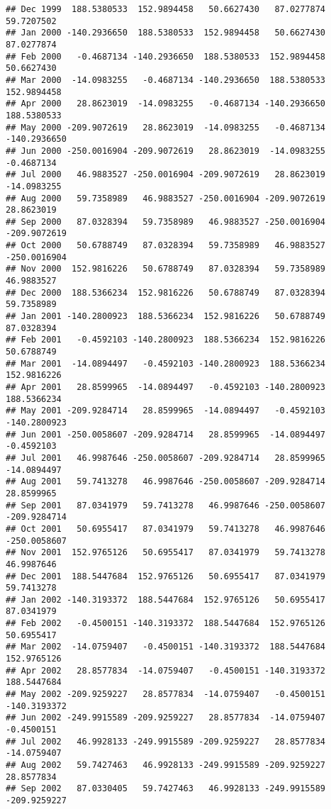 \documentclass[]{article}
\begin{document}
\begin{verbatim}
## Dec 1999  188.5380533  152.9894458   50.6627430   87.0277874   59.7207502
## Jan 2000 -140.2936650  188.5380533  152.9894458   50.6627430   87.0277874
## Feb 2000   -0.4687134 -140.2936650  188.5380533  152.9894458   50.6627430
## Mar 2000  -14.0983255   -0.4687134 -140.2936650  188.5380533  152.9894458
## Apr 2000   28.8623019  -14.0983255   -0.4687134 -140.2936650  188.5380533
## May 2000 -209.9072619   28.8623019  -14.0983255   -0.4687134 -140.2936650
## Jun 2000 -250.0016904 -209.9072619   28.8623019  -14.0983255   -0.4687134
## Jul 2000   46.9883527 -250.0016904 -209.9072619   28.8623019  -14.0983255
## Aug 2000   59.7358989   46.9883527 -250.0016904 -209.9072619   28.8623019
## Sep 2000   87.0328394   59.7358989   46.9883527 -250.0016904 -209.9072619
## Oct 2000   50.6788749   87.0328394   59.7358989   46.9883527 -250.0016904
## Nov 2000  152.9816226   50.6788749   87.0328394   59.7358989   46.9883527
## Dec 2000  188.5366234  152.9816226   50.6788749   87.0328394   59.7358989
## Jan 2001 -140.2800923  188.5366234  152.9816226   50.6788749   87.0328394
## Feb 2001   -0.4592103 -140.2800923  188.5366234  152.9816226   50.6788749
## Mar 2001  -14.0894497   -0.4592103 -140.2800923  188.5366234  152.9816226
## Apr 2001   28.8599965  -14.0894497   -0.4592103 -140.2800923  188.5366234
## May 2001 -209.9284714   28.8599965  -14.0894497   -0.4592103 -140.2800923
## Jun 2001 -250.0058607 -209.9284714   28.8599965  -14.0894497   -0.4592103
## Jul 2001   46.9987646 -250.0058607 -209.9284714   28.8599965  -14.0894497
## Aug 2001   59.7413278   46.9987646 -250.0058607 -209.9284714   28.8599965
## Sep 2001   87.0341979   59.7413278   46.9987646 -250.0058607 -209.9284714
## Oct 2001   50.6955417   87.0341979   59.7413278   46.9987646 -250.0058607
## Nov 2001  152.9765126   50.6955417   87.0341979   59.7413278   46.9987646
## Dec 2001  188.5447684  152.9765126   50.6955417   87.0341979   59.7413278
## Jan 2002 -140.3193372  188.5447684  152.9765126   50.6955417   87.0341979
## Feb 2002   -0.4500151 -140.3193372  188.5447684  152.9765126   50.6955417
## Mar 2002  -14.0759407   -0.4500151 -140.3193372  188.5447684  152.9765126
## Apr 2002   28.8577834  -14.0759407   -0.4500151 -140.3193372  188.5447684
## May 2002 -209.9259227   28.8577834  -14.0759407   -0.4500151 -140.3193372
## Jun 2002 -249.9915589 -209.9259227   28.8577834  -14.0759407   -0.4500151
## Jul 2002   46.9928133 -249.9915589 -209.9259227   28.8577834  -14.0759407
## Aug 2002   59.7427463   46.9928133 -249.9915589 -209.9259227   28.8577834
## Sep 2002   87.0330405   59.7427463   46.9928133 -249.9915589 -209.9259227

\end{verbatim}
\end{document}
